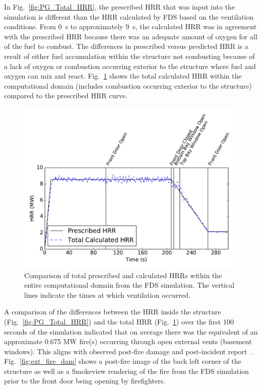 \documentclass[12pt,oneside]{book}
\begin{document}
In Fig.~\ref{fig:PG_Total_HRR}, the prescribed HRR that was input into the simulation is different than the HRR calculated by FDS based on the ventilation conditions. From 0~s to approximately 9~s, the calculated HRR was in agreement with the prescribed HRR because there was an adequate amount of oxygen for all of the fuel to combust. The differences in prescribed versus predicted HRR is a result of either fuel accumulation within the structure not combusting because of a lack of oxygen or combustion occurring exterior to the structure where fuel and oxygen can mix and react. Fig.~\ref{fig:PG_9MW_HRR} shows the total calculated HRR within the computational domain (includes combustion occurring exterior to the structure) compared to the prescribed HRR curve.

\begin{figure}[!ht]
\includegraphics[width=5in]{../Figures/PG_9MW_HRR}
\caption[Prescribed and total calculated HRRs vs. time from the simulation.]
{Comparison of total prescribed and calculated HRRs within the entire computational domain from the FDS simulation. The vertical lines indicate the times at which ventilation occurred.}
\label{fig:PG_9MW_HRR}
\end{figure}

A comparison of the differences between the HRR inside the structure (Fig.~\ref{fig:PG_Total_HRR}) and the total HRR (Fig.~\ref{fig:PG_9MW_HRR}) over the first 100 seconds of the simulation indicated that on average there was the equivalent of an approximate 0.675 MW fire(s) occurring through open external vents (basement windows). This aligns with observed post-fire damage and post-incident report~\cite{PGCounty2013}. Fig.~\ref{fig:ext_fire_dam} shows a post-fire image of the back left corner of the structure as well as a Smokeview rendering of the fire from the FDS simulation prior to the front door being opening by firefighters.
\end{document}
